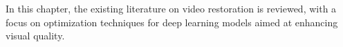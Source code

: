 \label{chap:Background}

In this chapter, the existing literature on video restoration is reviewed, with a focus on optimization techniques for deep learning models aimed at enhancing visual quality.

 

